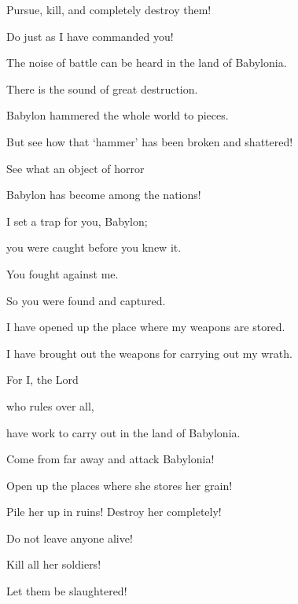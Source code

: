 {\par }{\Q Pursue,
kill, and completely destroy them!

\par }{\Q Do
just
as I have commanded you!
\par }{\Q {}The noise
of battle
can be heard in the land
of Babylonia.

\par }{\Q There is the sound of great
destruction.
\par }{\Q {}Babylon hammered
the whole
world
to pieces.
\par }{\Q But see how that ‘hammer’
has been broken and shattered!

\par }{\Q See what an object of horror
\par }{\Q Babylon
has become among the nations!
\par }{\Q {}I set a trap
for you, Babylon;
\par }{\Q you
were caught
before you
knew
it.
\par }{\Q You fought
against me.
\par }{\Q So you were found
and captured.
\par }{\Q {}I have opened
up the
place where my weapons are stored.
\par }{\Q I have brought out
the
weapons
for carrying out my wrath.
\par }{\Q For
I, the Lord

{}
who rules over all,
\par }{\Q have work
to carry out in the land
of Babylonia.
\par }{\Q {}Come
from far away and attack Babylonia!

\par }{\Q Open
up the places where she stores
her grain!
\par }{\Q Pile her up
in ruins! Destroy
her completely!

\par }{\Q Do not
leave anyone alive!
\par }{\Q {}Kill
all
her soldiers!

\par }{\Q Let
them be slaughtered!

}
